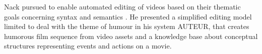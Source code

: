 Nack pursued to enable automated editing of videos based on their thematic goals concerning syntax and semantics \cite{nack1997application}.
He presented a simplified editing model limited to deal with the theme of humour in his system AUTEUR, that creates humorous film sequence from video assets and a knowledge base about conceptual structures representing events and actions on a movie.

